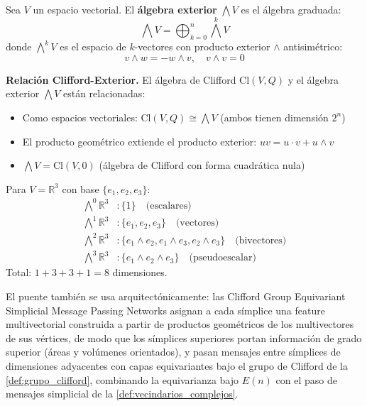 \begin{definition}\label{def:algebra_exterior}
Sea $V$ un espacio vectorial. El \textbf{álgebra exterior} $\bigwedge V$ es el álgebra graduada:
\[\bigwedge V = \bigoplus_{k=0}^n \bigwedge^k V\]
donde $\bigwedge^k V$ es el espacio de $k$-vectores con producto exterior $\wedge$ antisimétrico:
\[v \wedge w = -w \wedge v, \quad v \wedge v = 0\]
\end{definition}

\textbf{Relación Clifford-Exterior.}\label{rem:clifford_exterior} El álgebra de Clifford $\text{Cl}(V, Q)$ y el álgebra exterior $\bigwedge V$ están relacionadas:
\begin{itemize}
    \item Como espacios vectoriales: $\text{Cl}(V,Q) \cong \bigwedge V$ (ambos tienen dimensión $2^n$)
    \item El producto geométrico extiende el producto exterior: $uv = u \cdot v + u \wedge v$
    \item $\bigwedge V = \text{Cl}(V, 0)$ (álgebra de Clifford con forma cuadrática nula)
\end{itemize}

\begin{example}\label{ex:base_exterior_3d}
Para $V = \mathbb{R}^3$ con base $\{e_1, e_2, e_3\}$:
\begin{align}
\bigwedge^0 \mathbb{R}^3 &: \{1\} \quad \text{(escalares)} \\
\bigwedge^1 \mathbb{R}^3 &: \{e_1, e_2, e_3\} \quad \text{(vectores)} \\
\bigwedge^2 \mathbb{R}^3 &: \{e_1 \wedge e_2, e_1 \wedge e_3, e_2 \wedge e_3\} \quad \text{(bivectores)} \\
\bigwedge^3 \mathbb{R}^3 &: \{e_1 \wedge e_2 \wedge e_3\} \quad \text{(pseudoescalar)}
\end{align}
Total: $1 + 3 + 3 + 1 = 8$ dimensiones.
\end{example}

El puente también se usa arquitectónicamente: las Clifford Group Equivariant Simplicial Message Passing Networks \citep{liu2024cliffordsimplicial} asignan a cada símplice una feature multivectorial construida a partir de productos geométricos de los multivectores de sus vértices, de modo que los símplices superiores portan información de grado superior (áreas y volúmenes orientados), y pasan mensajes entre símplices de dimensiones adyacentes con capas equivariantes bajo el grupo de Clifford de la \autoref{def:grupo_clifford}, combinando la equivarianza bajo $E(n)$ con el paso de mensajes simplicial de la \autoref{def:vecindarios_complejos}.

